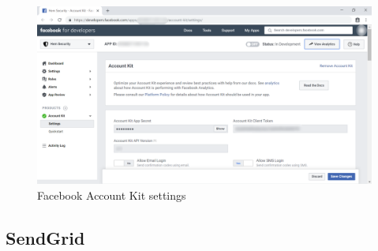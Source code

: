 \begin{enumerate}
\begin{center}
\begin{figure}[H]
	      		\centering
	      		\includegraphics[width=0.6\columnwidth]{images/appendixA/Facebook-AccountKit-Settings.png}
	      		\caption{Facebook Account Kit settings}
	      	\end{figure}
	      \end{center}
\end{enumerate}

\tocless\subsection{SendGrid}
